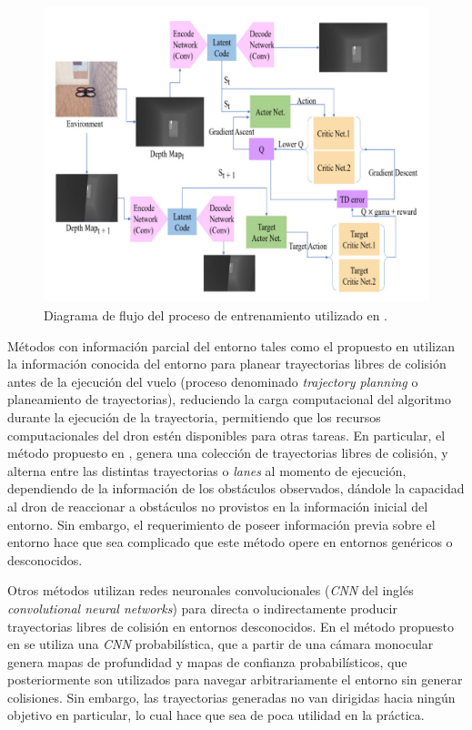     \begin{figure}[H]
        \centering
        \includegraphics[scale=0.4]{partes/img/RL-training-process.png}
        \caption[Diagrama de flujo del proceso de entrenamiento utilizado en \textit{Vision Based Drone Obstacle Avoidance by Deep Reinforcement Learning}]{Diagrama de flujo del proceso de entrenamiento utilizado en \cite{Xue2021}.}
        \label{fig:rl-training-process}
    \end{figure}

    \par Métodos con información parcial del entorno tales como el propuesto en \cite{Zhang2019} utilizan la información conocida del entorno para planear trayectorias libres de colisión antes de la ejecución del vuelo (proceso denominado \textit{trajectory planning} o planeamiento de trayectorias), reduciendo la carga computacional del algoritmo durante la ejecución de la trayectoria, permitiendo que los recursos computacionales del dron estén disponibles para otras tareas. En particular, el método propuesto en \cite{Zhang2019}, genera una colección de trayectorias libres de colisión, y alterna entre las distintas trayectorias o \textit{lanes} al momento de ejecución, dependiendo de la información de los obstáculos observados, dándole la capacidad al dron de reaccionar a obstáculos no provistos en la información inicial del entorno. Sin embargo, el requerimiento de poseer información previa sobre el entorno hace que sea complicado que este método opere en entornos genéricos o desconocidos.

    \par Otros métodos utilizan redes neuronales convolucionales (\textit{CNN} del inglés \textit{convolutional neural networks}) para directa o indirectamente producir trayectorias libres de colisión en entornos desconocidos. En el método propuesto en \cite{Yang2021} se utiliza una \textit{CNN} probabilística, que a partir de una cámara monocular genera mapas de profundidad y mapas de confianza probabilísticos, que posteriormente son utilizados para navegar arbitrariamente el entorno sin generar colisiones. Sin embargo, las trayectorias generadas no van dirigidas hacia ningún objetivo en particular, lo cual hace que sea de poca utilidad en la práctica.

